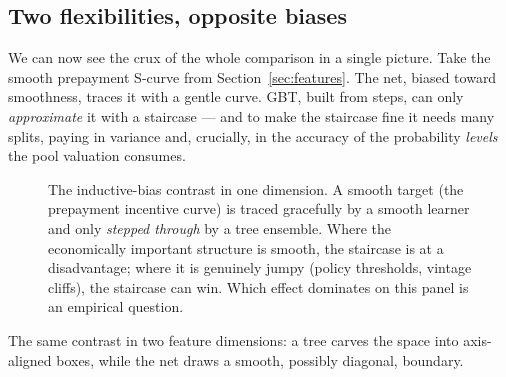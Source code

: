 \documentclass[11pt]{article}
\begin{document}
\subsection{Two flexibilities, opposite biases}

We can now see the crux of the whole comparison in a single picture. Take the smooth prepayment
S-curve from Section~\ref{sec:features}. The net, biased toward smoothness, traces it with a
gentle curve. GBT, built from steps, can only \emph{approximate} it with a staircase --- and to
make the staircase fine it needs many splits, paying in variance and, crucially, in the accuracy
of the probability \emph{levels} the pool valuation consumes.

\begin{figure}[H]
\centering
{}
\caption{The inductive-bias contrast in one dimension. A smooth target (the prepayment
incentive curve) is traced gracefully by a smooth learner and only \emph{stepped through} by a
tree ensemble. Where the economically important structure is smooth, the staircase is at a
disadvantage; where it is genuinely jumpy (policy thresholds, vintage cliffs), the staircase can
win. Which effect dominates on this panel is an empirical question.}
\end{figure}

The same contrast in two feature dimensions: a tree carves the space into axis-aligned boxes,
while the net draws a smooth, possibly diagonal, boundary.
\end{document}
